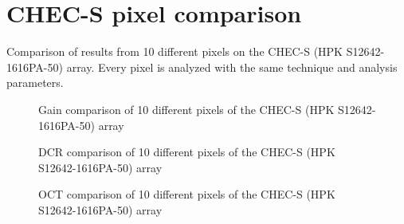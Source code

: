 \documentclass[12pt,article,type=msc,colorback,accentcolor=tud9c]{tudthesis}
\begin{document}
{\clearpage
\section{CHEC-S pixel comparison}
Comparison of results from 10 different pixels on the CHEC-S (HPK S12642-1616PA-50) array. Every pixel is analyzed with the same technique and analysis parameters.

\begin{figure}[h]
\begin{centering}
\caption{Gain comparison of 10 different pixels of the CHEC-S (HPK S12642-1616PA-50) array}
\label{app:CHEC_S_multipixel_Gain}
\end{centering}
\end{figure}

\begin{figure}[h]
\begin{centering}
\caption{DCR comparison of 10 different pixels of the CHEC-S (HPK S12642-1616PA-50) array}
\label{app:CHEC_S_multipixel_DCR}
\end{centering}
\end{figure}

\begin{figure}[ht]
\begin{centering}
\caption{OCT comparison of 10 different pixels of the CHEC-S (HPK S12642-1616PA-50) array}
\label{app:CHEC_S_multipixel_OCT}
\end{centering}
\end{figure}


}
\end{document}
